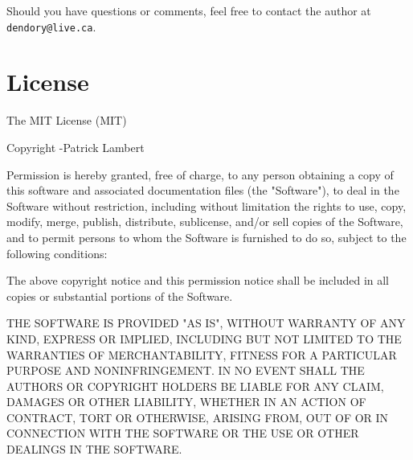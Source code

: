 \documentclass[11pt]{article}
\begin{document}
Should you have questions or comments, feel free to contact the author at \texttt{dendory@live.ca}.

\section{License}
The MIT License (MIT)

Copyright \textcopyright {}-\the\year \thinspace Patrick Lambert

Permission is hereby granted, free of charge, to any person obtaining a copy
of this software and associated documentation files (the "Software"), to deal
in the Software without restriction, including without limitation the rights
to use, copy, modify, merge, publish, distribute, sublicense, and/or sell
copies of the Software, and to permit persons to whom the Software is
furnished to do so, subject to the following conditions:

The above copyright notice and this permission notice shall be included in
all copies or substantial portions of the Software.

THE SOFTWARE IS PROVIDED "AS IS", WITHOUT WARRANTY OF ANY KIND, EXPRESS OR
IMPLIED, INCLUDING BUT NOT LIMITED TO THE WARRANTIES OF MERCHANTABILITY,
FITNESS FOR A PARTICULAR PURPOSE AND NONINFRINGEMENT. IN NO EVENT SHALL THE
AUTHORS OR COPYRIGHT HOLDERS BE LIABLE FOR ANY CLAIM, DAMAGES OR OTHER
LIABILITY, WHETHER IN AN ACTION OF CONTRACT, TORT OR OTHERWISE, ARISING FROM,
OUT OF OR IN CONNECTION WITH THE SOFTWARE OR THE USE OR OTHER DEALINGS IN
THE SOFTWARE.
\end{document}
